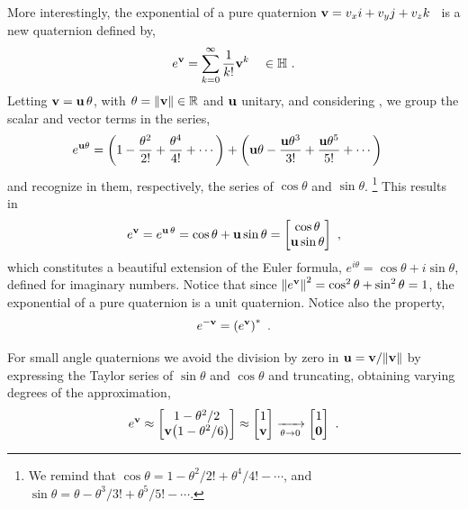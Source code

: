 More interestingly,  the exponential of a pure quaternion ${\bf v}=v_xi+v_yj+v_zk$~ is a new quaternion defined by,
%
\begin{align}
e^{\bf v}
= \sum_{k=0}^\infty \frac{1}{k!}{\bf v}^k \quad \in {\mathbb H}
~.
\label{equ:pureQuatExpSeries}
\end{align}
%
Letting ${\bf v}={\bf u}\,\theta$, with $\theta={\left\|{\bf v}\right\|}\in{\mathbb R}$ and ${\bf u}$ unitary, and considering , we group the scalar and vector terms in the series, 
%
\begin{align}
e^{{\bf u}\theta} 
&= \left(1-\frac{\theta^2}{2!}+\frac{\theta^4}{4!}+\cdots\right) + \left({\bf u}\theta - \frac{{\bf u}\theta^3}{3!}+\frac{{\bf u}\theta^5}{5!}+\cdots\right)
\end{align}
%
and recognize in them, respectively, the series of $\cos\theta$ and $\sin\theta$.%
%
\footnote{We remind that $\cos \theta = 1 - \theta^2/2! + \theta^4/4! - \cdots$, and $\sin \theta =  \theta - \theta^3/3! + \theta^5/5! - \cdots$.}
%
 This results in
%
\begin{align}
e^{\bf v}
= e^{{\bf u}\,\theta} 
= \cos\theta + {\bf u}\sin\theta = \begin{bmatrix}
\cos\theta \\ {\bf u}\sin\theta 
\end{bmatrix} ~,
\label{equ:EulerFormulaQuat}
\end{align}
%
which constitutes a beautiful extension of the Euler formula, $e^{i\theta}=\cos\theta+i\sin\theta$, defined for imaginary numbers. 
%
Notice that since ${\left\|e^{{\bf v}}\right\|}^2=\cos^2\theta+\sin^2\theta=1$, the exponential of a pure quaternion is a unit quaternion.
Notice also the property,
%
\begin{align}
e^{-{\bf v}} = \left(e^{{\bf v}}\right)^*
~.
\end{align}

For small angle quaternions we avoid the division by zero in ${\bf u}={\bf v}/{\left\|{\bf v}\right\|}$ by expressing the Taylor series of $\sin\theta$ and $\cos\theta$ and truncating, obtaining varying degrees of the approximation,
%
\begin{align}
e^{\bf v} 
\approx
\begin{bmatrix}
1-\theta^2/2 \\ {\bf v}\big(1-\theta^2/6\big) 
\end{bmatrix}
\approx
\begin{bmatrix}
1 \\ {\bf v} 
\end{bmatrix}
\xrightarrow[\theta\to 0]{}
\begin{bmatrix}
1 \\ {\bf0}
\end{bmatrix}
~.
\end{align}
%



